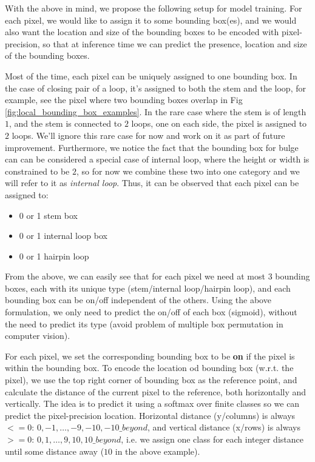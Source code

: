 \documentclass[12pt]{article}
\begin{document}
With the above in mind, we propose the following setup for model training.
For each pixel, we would like to assign it to some bounding box(es),
and we would also want the location and size of the bounding boxes to be encoded with pixel-precision,
so that at inference time we can predict the presence, location and size of the bounding boxes.



Most of the time, each pixel can be uniquely assigned to one bounding box.
In the case of closing pair of a loop, it's assigned to both the stem and the loop,
for example, see the pixel where two bounding boxes overlap in Fig \ref{fig:local_bounding_box_examples}.
In the rare case where the stem is of length $1$, and the stem is connected to $2$ loops, one on each side,
the pixel is assigned to $2$ loops. We'll ignore this rare case for now and work on it as part of future improvement.
Furthermore, we notice the fact that the bounding box for bulge can can be considered a special case of internal loop,
where the height or width is constrained to be $2$, so for now we combine these two into one category and we will refer to
it as \textit{internal loop}.
Thus, it can be observed that each pixel can be assigned to:

\begin{itemize}
    \item 0 or 1 stem box
    \item 0 or 1 internal loop box
    \item 0 or 1 hairpin loop
\end{itemize}

From the above, we can easily see that for each pixel we need at most 3 bounding boxes,
each with its unique type (stem/internal loop/hairpin loop),
and each bounding box can be on/off independent of the others.
Using the above formulation, we only need to predict the on/off of each box (sigmoid),
without the need to predict its type (avoid problem of multiple box permutation in computer vision).

For each pixel, we set the corresponding bounding box to be \textbf{on} if the pixel is within the bounding box.
To encode the location od bounding box (w.r.t. the pixel),
we use the top right corner of bounding box as the reference point,
and calculate the distance of the current pixel to the reference,
both horizontally and vertically.
The idea is to predict it using a softmax over finite classes so we can predict the pixel-precision location.
Horizontal distance (y/columns) is always $<= 0$: $ 0, -1, \dots, -9, -10, -10\_beyond$,
and vertical distance (x/rows) is always $>= 0$: $0, 1, \dots, 9, 10, 10\_beyond$,
i.e. we assign one class for each integer distance until some distance away ($10$ in the above example).
\end{document}
